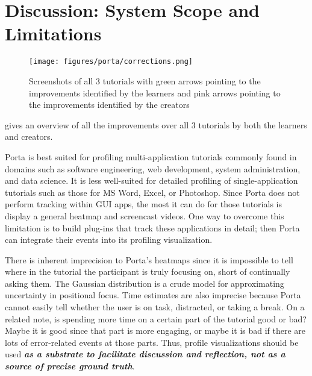 \section{Discussion: System Scope and Limitations}

\begin{figure*}[h!]
\centering
\texttt{[image: figures/porta/corrections.png]}

\caption{Screenshots of all 3 tutorials with green arrows pointing to the improvements identified by the learners and pink arrows pointing to the improvements identified by the creators}

\vspace{-0.25em} %

\label{fig:corrections}
\end{figure*}

 gives an overview of all the improvements over all 3 tutorials by both the learners and creators.

Porta is best suited for profiling multi-application tutorials commonly
found in domains such as software engineering, web development, system
administration, and data science. It is less well-suited for detailed
profiling of single-application tutorials such as those for MS Word,
Excel, or Photoshop. Since Porta does not perform tracking within GUI
apps, the most it can do for those tutorials is display a general
heatmap and screencast videos.
%
One way to overcome this limitation is to build plug-ins that track
these applications in detail; then Porta can integrate their events into
its profiling visualization.

There is inherent imprecision to Porta's heatmaps since it is impossible
to tell where in the tutorial the participant is truly focusing on,
short of continually asking them. The Gaussian distribution is a crude
model for approximating uncertainty in positional focus. Time estimates
are also imprecise because Porta cannot easily tell whether the user is
on task, distracted, or taking a break.
%
%
On a related note, is spending more time on a certain part of the
tutorial good or bad? Maybe it is good since that part is more engaging,
or maybe it is bad if there are lots of error-related events at those
parts. Thus, profile visualizations should be used \textbf{\emph{as a
substrate to facilitate discussion and reflection, not as a source of
precise ground truth}}.

